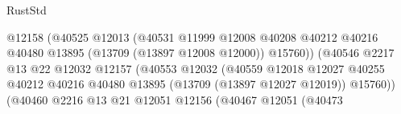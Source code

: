 \begin{lexlean}{RustStd}
\begin{coremodule}
                                                      @12158
                                                      (@40525
                                                        @12013
                                                        (@40531
                                                          @11999
                                                          @12008
                                                          @40208
                                                          @40212
                                                          @40216
                                                          @40480
                                                          @13895
                                                          (@13709 (@13897 @12008 @12000))
                                                          @15760))
                                                      (@40546
                                                        @2217
                                                        @13
                                                        @22
                                                        @12032
                                                        @12157
                                                        (@40553
                                                          @12032
                                                          (@40559
                                                            @12018
                                                            @12027
                                                            @40255
                                                            @40212
                                                            @40216
                                                            @40480
                                                            @13895
                                                            (@13709 (@13897 @12027 @12019))
                                                            @15760))
                                                        (@40460
                                                          @2216
                                                          @13
                                                          @21
                                                          @12051
                                                          @12156
                                                          (@40467
                                                            @12051
                                                            (@40473

\end{coremodule}
\end{lexlean}

